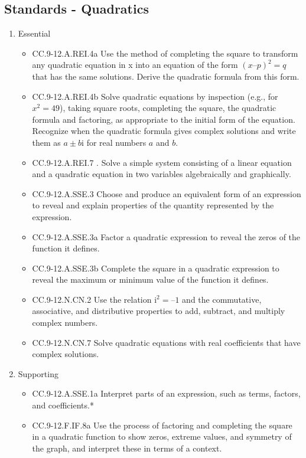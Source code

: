 \documentclass{article}
\begin{document}
\subsection*{Standards - Quadratics}
\begin{enumerate}
	\item Essential
	\begin{itemize}
		\item CC.9-12.A.REI.4a Use the method of completing the square to transform any quadratic equation in x into an equation of the form $(x – p)^2 = q$ that has the same solutions. Derive the quadratic formula from this form. 
		\item CC.9-12.A.REI.4b Solve quadratic equations by inspection (e.g., for $x^2 = 49$), taking square roots, completing the square, the quadratic formula and factoring, as appropriate to the initial form of the equation. Recognize when the quadratic formula gives complex solutions and write them as $a \pm b\textrm{i}$ for real numbers $a$ and $b$.
		\item CC.9-12.A.REI.7 . Solve a simple system consisting of a linear equation and a quadratic equation in two variables algebraically and graphically. 
		\item CC.9-12.A.SSE.3 Choose and produce an equivalent form of an expression to reveal and explain properties of the quantity represented by the expression.
		\item CC.9-12.A.SSE.3a Factor a quadratic expression to reveal the zeros of the function it defines.
		\item CC.9-12.A.SSE.3b Complete the square in a quadratic expression to reveal the maximum or minimum value of the function it defines.
		\item CC.9-12.N.CN.2 Use the relation $\textrm{i}^2 = –1$ and the commutative, associative, and distributive properties to add, subtract, and multiply complex numbers.
		\item CC.9-12.N.CN.7  Solve quadratic equations with real coefficients that have complex solutions.
	\end{itemize}		
	\item Supporting
	\begin{itemize}
		\item CC.9-12.A.SSE.1a Interpret parts of an expression, such as terms, factors, and coefficients.*
		\item CC.9-12.F.IF.8a Use the process of factoring and completing the square in a quadratic function to show zeros, extreme values, and symmetry of the graph, and interpret these in terms of a context. 

\end{itemize}
\end{enumerate}
\end{document}
